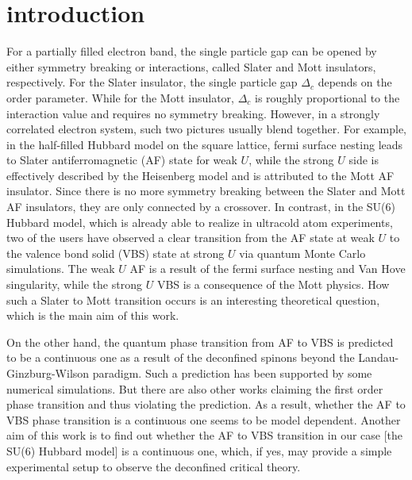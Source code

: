 \documentclass[twocolumn,superscriptaddress]{revtex4-1}
\begin{document}
\section{introduction}
For a partially filled electron band, the single particle gap can be opened by either symmetry breaking or interactions, called Slater and Mott insulators, respectively. For the Slater insulator, the single particle gap $\Delta_c$ depends on the order parameter. While for the Mott insulator, $\Delta_c$ is roughly proportional to the interaction value and requires no symmetry breaking. However, in a strongly correlated electron system, such two pictures usually blend together. For example, in the half-filled Hubbard model on the square lattice, fermi surface nesting leads to Slater antiferromagnetic (AF) state for weak $U$, while the strong $U$ side is effectively described by the Heisenberg model and is attributed to the Mott AF insulator. Since there is no more symmetry breaking between the Slater and Mott AF insulators, they are only connected by a crossover. In contrast, in the SU(6) Hubbard model, which is already able to realize in ultracold atom experiments, two of the users have observed a clear transition from the AF state at weak $U$ to the valence bond solid (VBS) state at strong $U$ via quantum Monte Carlo simulations. The weak $U$ AF is a result of the fermi surface nesting and Van Hove singularity, while the strong $U$ VBS is a consequence of the Mott physics. How such a Slater to Mott transition occurs is an interesting theoretical question, which is the main aim of this work.

On the other hand, the quantum phase transition from AF to VBS is predicted to be a continuous one as a result of the deconfined spinons beyond the Landau-Ginzburg-Wilson paradigm. Such a prediction has been supported by some numerical simulations. But there are also other works claiming the first order phase transition and thus violating the prediction. As a result, whether the AF to VBS phase transition is a continuous one seems to be model dependent. Another aim of this work is to find out whether the AF to VBS transition in our case [the SU(6) Hubbard model] is a continuous one, which, if yes, may provide a simple experimental setup to observe the deconfined critical theory. 

\end{document}
